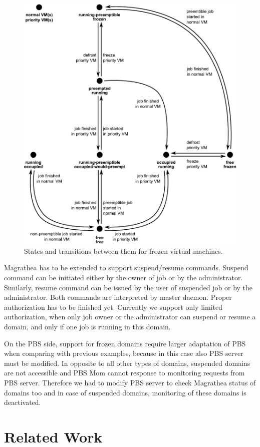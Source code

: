 \documentclass[a4paper]{article}
\begin{document}
\begin{figure}[tb]
    \begin{center}
    \includegraphics[width=.8\textwidth]{frozen}
    \end{center}
    \caption{States and transitions between them for frozen
        virtual machines.}
    \label{fig:frozen}
\end{figure}

Magrathea has to be extended to support suspend/resume commands. Suspend
command can be initiated either by the owner of job or by the administrator.
Similarly, resume command can be issued by the user of suspended job or by the
administrator. Both commands are interpreted by master daemon. Proper
authorization has to be finished yet. Currently we support only limited
authorization, when only job owner or the administrator can suspend or resume
a domain, and only if one job is running in this domain.

On the PBS side, support for frozen domains require larger adaptation of PBS
when comparing with previous examples, because in this case also PBS server
must be modified. In opposite to all other types of domains, suspended domains
are not accessible and PBS Mom cannot response to monitoring requests from PBS
server.  Therefore we had to modify PBS server to check Magrathea status of
domains too and in case of suspended domains, monitoring of these domains is
deactivated.

\section{Related Work}
\end{document}
